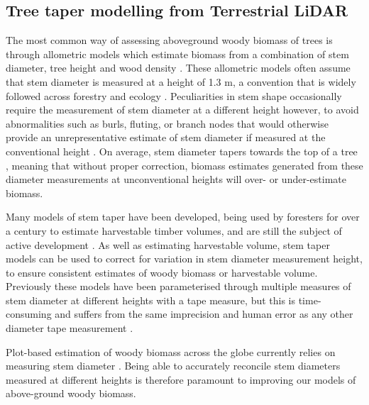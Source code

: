 \begin{refsection}
\subsection{Tree taper modelling from Terrestrial LiDAR} 
\label{legacy:ssec:taper}

The most common way of assessing aboveground woody biomass of trees is through allometric models which estimate biomass from a combination of stem diameter, tree height and wood density \citep{Chave2014}. These allometric models often assume that stem diameter is measured at a height of 1.3 m, a convention that is widely followed across forestry and ecology \citep{Brokaw2000}. Peculiarities in stem shape occasionally require the measurement of stem diameter at a different height however, to avoid abnormalities such as burls, fluting, or branch nodes that would otherwise provide an unrepresentative estimate of stem diameter if measured at the conventional height \citep{Kershaw2017}. On average, stem diameter tapers towards the top of a tree \citep{Kozak1969}, meaning that without proper correction, biomass estimates generated from these diameter measurements at unconventional heights will over- or under-estimate biomass. 

Many models of stem taper have been developed, being used by foresters for over a century to estimate harvestable timber volumes, and are still the subject of active development \citep{MacFarlane2016, Luoma2019}. As well as estimating harvestable volume, stem taper models can be used to correct for variation in stem diameter measurement height, to ensure consistent estimates of woody biomass or harvestable volume. Previously these models have been parameterised through multiple measures of stem diameter at different heights with a tape measure, but this is time-consuming and suffers from the same imprecision and human error as any other diameter tape measurement \citep{Saarinen2019}. 

Plot-based estimation of woody biomass across the globe currently relies on measuring stem diameter \citep{SEOSAW2020, Chave2005, Schepaschenko2019}. Being able to accurately reconcile stem diameters measured at different heights is therefore paramount to improving our models of above-ground woody biomass.


\end{refsection}
